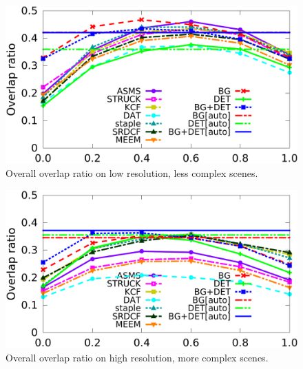 \begin{figure}
  \centering
    \includegraphics[width=\linewidth]{./img/evaluation/overlapRatioAllPerObj_lowRes.png}
    \caption{Overall overlap ratio on low resolution, less complex scenes.}
    \label{fig:kf-eval-overlap-low}
\end{figure}
\begin{figure}
    \centering
    \includegraphics[width=\linewidth]{./img/evaluation/overlapRatioAllPerObj_highRes.png}
    \caption{Overall overlap ratio on high resolution, more complex scenes.}
    \label{fig:kf-eval-overlap-high}
\end{figure}